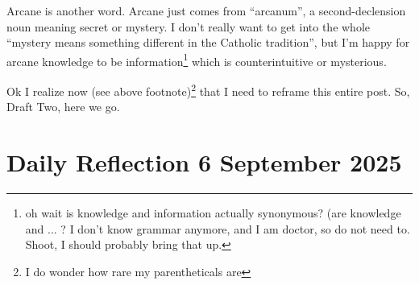 \documentclass[12pt]{article}
\newcommand{\say}[1]{``#1''}
\renewcommand{\,}{\textsuperscript{,}}
\begin{document}
Arcane is another word.  
Arcane just comes from \say{arcanum}, a second-declension noun meaning secret or mystery.  
I don't really want to get into the whole \say{mystery means something different in the Catholic tradition}, but I'm happy for arcane knowledge to be information\footnote{oh wait is knowledge and information actually synonymous? (are knowledge and ... ? I don't know grammar anymore, and I am doctor, so do not need to. Shoot, I should probably bring that up.} which is counterintuitive or mysterious.

Ok I realize now (see above footnote)\footnote{I do wonder how rare my parentheticals are} that I need to reframe this entire post.  
So, Draft Two, here we go.

\section{Daily Reflection 6 September 2025}
\end{document}
